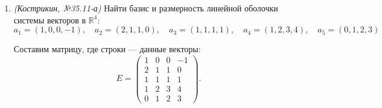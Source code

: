 \begin{enumerate}
\[
E =
\begin{pmatrix}
    1 & -1 & 1 & -1 & 1 \\
    1 & 1 & 0 & 0 & 3 \\
    3 & 1 & 1 & -1 & 7 \\
    0 & 2 & -1 & 1 & 2
\end{pmatrix}.
\]

Приведём к ступенчатому виду:
\[
\begin{pmatrix}
    1 & -1 & 1 & -1 & 1 \\
    1 & 1 & 0 & 0 & 3 \\
    3 & 1 & 1 & -1 & 7 \\
    0 & 2 & -1 & 1 & 2
\end{pmatrix}
\xrightarrow{\,\, (2)-(1),\ (3)-3(1) \,\,}
\begin{pmatrix}
    1 & -1 & 1 & -1 & 1 \\
    0 & 2 & -1 & 1 & 2 \\
    0 & 4 & -2 & 2 & 4 \\
    0 & 2 & -1 & 1 & 2
\end{pmatrix}
\]
\[
\xrightarrow{\,\, (3)-2(2),\ (4)-(2) \,\,}
\begin{pmatrix}
    1 & -1 & 1 & -1 & 1 \\
    0 & 2 & -1 & 1 & 2 \\
    0 & 0 & 0 & 0 & 0 \\
    0 & 0 & 0 & 0 & 0
\end{pmatrix}.
\]

Тогда
\[
\begin{cases}
    x_1 - x_2 + x_3 - x_4 + x_5 = 0,\\
    2x_2 - x_3 + x_4 + 2x_5 = 0.
\end{cases}
\]

Отсюда можно взять систему
\[
\begin{cases}
    -2x_1 - x_2 + x_5 = 0,\\
    x_1 - x_2 + 2x_4 = 0,\\
    -x_1 + x_2 + 2x_3 = 0.
\end{cases}
\]

\item \textit{(Кострикин, №35.11-а)} Найти базис и размерность линейной оболочки системы векторов в $\mathbb{R}^4$:
\[
a_1 = (1, 0, 0, -1), \quad a_2 = (2, 1, 1, 0), \quad a_3 = (1, 1, 1, 1), \quad a_4 = (1, 2, 3, 4), \quad a_5 = (0, 1, 2, 3)
\]

Составим матрицу, где строки — данные векторы:
\[
E =
\begin{pmatrix}
    1 & 0 & 0 & -1 \\
    2 & 1 & 1 & 0 \\
    1 & 1 & 1 & 1 \\
    1 & 2 & 3 & 4 \\
    0 & 1 & 2 & 3
\end{pmatrix}.
\]


\end{enumerate}

